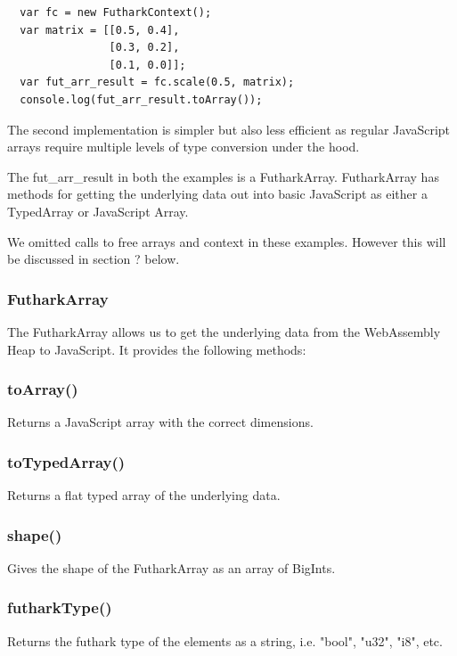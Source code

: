 \documentclass[11pt]{book}
\begin{document}
\begin{verbatim}
  var fc = new FutharkContext();
  var matrix = [[0.5, 0.4], 
                [0.3, 0.2],
                [0.1, 0.0]];
  var fut_arr_result = fc.scale(0.5, matrix);
  console.log(fut_arr_result.toArray());
\end{verbatim}

The second implementation is simpler but also less efficient as regular JavaScript arrays require multiple levels of type conversion under the hood.

The fut\_arr\_result in both the examples is a FutharkArray. FutharkArray has methods for getting the underlying data out into basic JavaScript as either a TypedArray or JavaScript Array.

We omitted calls to free arrays and context in these examples. However this will be discussed in section ? below.

\subsubsection*{FutharkArray}
The FutharkArray allows us to get the underlying data from the WebAssembly Heap to JavaScript. It provides the following methods:

\subsubsection*{toArray()}
Returns a JavaScript array with the correct dimensions.

\subsubsection*{toTypedArray()}
Returns a flat typed array of the underlying data.

\subsubsection*{shape()}
Gives the shape of the FutharkArray as an array of BigInts.

\subsubsection*{futharkType()}
Returns the futhark type of the elements as a string, i.e. "bool", "u32", "i8", etc.





\end{document}
